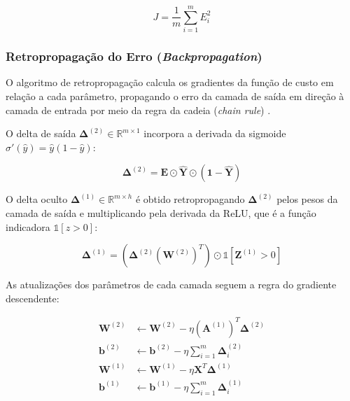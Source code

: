 \begin{equation}
J = \frac{1}{m} \sum_{i=1}^{m} E_i^2
\label{eq:mlp_custo}
\end{equation}

\subsubsection{Retropropagação do Erro (\textit{Backpropagation})}

O algoritmo de retropropagação calcula os gradientes da função de custo em relação a cada parâmetro, propagando o erro da camada de saída em direção à camada de entrada por meio da regra da cadeia (\textit{chain rule}) \cite{braga2007,silva2016}.

O delta de saída $\boldsymbol{\Delta}^{(2)} \in \mathbb{R}^{m \times 1}$ incorpora a derivada da sigmoide $\sigma'(\hat{y}) = \hat{y}(1 - \hat{y})$:

\begin{equation}
\boldsymbol{\Delta}^{(2)} = \mathbf{E} \odot \hat{\mathbf{Y}} \odot \left(\mathbf{1} - \hat{\mathbf{Y}}\right)
\label{eq:mlp_delta2}
\end{equation}

O delta oculto $\boldsymbol{\Delta}^{(1)} \in \mathbb{R}^{m \times h}$ é obtido retropropagando $\boldsymbol{\Delta}^{(2)}$ pelos pesos da camada de saída e multiplicando pela derivada da ReLU, que é a função indicadora $\mathbb{1}[z > 0]$:

\begin{equation}
\boldsymbol{\Delta}^{(1)} = \left(\boldsymbol{\Delta}^{(2)} \left(\mathbf{W}^{(2)}\right)^T\right) \odot \mathbb{1}\!\left[\mathbf{Z}^{(1)} > 0\right]
\label{eq:mlp_delta1}
\end{equation}

As atualizações dos parâmetros de cada camada seguem a regra do gradiente descendente:

\begin{align}
\mathbf{W}^{(2)} &\leftarrow \mathbf{W}^{(2)} - \eta \left(\mathbf{A}^{(1)}\right)^T \boldsymbol{\Delta}^{(2)} \label{eq:mlp_upd_w2} \\
\mathbf{b}^{(2)} &\leftarrow \mathbf{b}^{(2)} - \eta \sum_{i=1}^{m} \boldsymbol{\Delta}^{(2)}_i \label{eq:mlp_upd_b2} \\
\mathbf{W}^{(1)} &\leftarrow \mathbf{W}^{(1)} - \eta \mathbf{X}^T \boldsymbol{\Delta}^{(1)} \label{eq:mlp_upd_w1} \\
\mathbf{b}^{(1)} &\leftarrow \mathbf{b}^{(1)} - \eta \sum_{i=1}^{m} \boldsymbol{\Delta}^{(1)}_i \label{eq:mlp_upd_b1}
\end{align}

